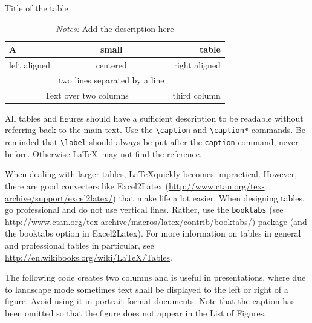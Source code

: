 \documentclass[a4paper,12pt]{scrartcl} %
\begin{document}
\begin{table}
\caption[Title for Table of Contents]{Title of the table}
\label{tab:Table1}
\centering
 \begin{tabular}{lcr}
   A & small  & table\\
\toprule
   left aligned & centered & right aligned \\
   & two lines separated by a line  & \\
\cmidrule{2-3}
   \multicolumn{2}{c}{Text over two columns} & third column \\
\bottomrule
\end{tabular}
\caption*{\footnotesize{\emph{Notes:} Add the description here}} %
\end{table}

All tables and figures should have a sufficient description to be readable without referring back to the main text. Use the \verb|\caption| and \verb|\caption*| commands. Be reminded that \verb|\label| should always be put after the \verb|caption| command, never before. Otherwise \LaTeX\ may not find the reference.

When dealing with larger tables, \LaTeX quickly becomes impractical. However, there are good converters like Excel2Latex (\url{http://www.ctan.org/tex-archive/support/excel2latex/}) that make life a lot easier. When designing tables, go professional and do not use vertical lines. Rather, use the \texttt{booktabs} (see \url{http://www.ctan.org/tex-archive/macros/latex/contrib/booktabs/})  package (and the booktabs option in Excel2Latex). For more information on tables in general and professional tables in particular, see \url{http://en.wikibooks.org/wiki/LaTeX/Tables}.

The following code creates two columns and is useful in presentations, where due to landscape mode sometimes text shall be displayed to the left or right of a figure. Avoid using it in portrait-format documents. Note that the caption has been omitted so that the figure does not appear in the List of Figures.
\end{document}
